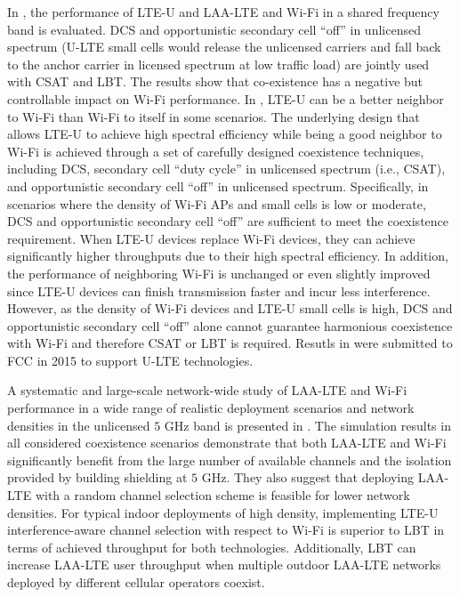 In \cite{U-LTE-Wi-Fi-Qualcomm-2014, LTE-U-Wi-Fi-LTE-U-Forum-2015, LTE-U-Qualcomm-2015, U-LTE-Wi-Fi-Qualcomm-FCC-2015}, the performance of LTE-U and LAA-LTE and Wi-Fi in a shared frequency band is evaluated. DCS and opportunistic secondary cell ``off'' in unlicensed spectrum (U-LTE small cells would release the unlicensed carriers and fall back to the anchor carrier in licensed spectrum at low traffic load) are jointly used with CSAT and LBT. The results show that co-existence has a negative but controllable impact on Wi-Fi performance. In \cite{U-LTE-Wi-Fi-Qualcomm-2014, LTE-U-Wi-Fi-LTE-U-Forum-2015, LTE-U-Qualcomm-2015}, LTE-U can be a better neighbor to Wi-Fi than Wi-Fi to itself in some scenarios. The underlying design that allows LTE-U to achieve high spectral efficiency while being a good neighbor to Wi-Fi is achieved through a set of carefully designed coexistence techniques, including DCS, secondary cell ``duty cycle'' in unlicensed spectrum (i.e., CSAT), and opportunistic secondary cell ``off'' in unlicensed spectrum. Specifically, in scenarios where the density of Wi-Fi APs and small cells is low or moderate, DCS and opportunistic secondary cell ``off'' are sufficient to meet the coexistence requirement. When LTE-U devices replace Wi-Fi devices, they can achieve significantly higher throughputs due to their high spectral efficiency. In addition, the performance of neighboring Wi-Fi is unchanged or even slightly improved since LTE-U devices can finish transmission faster and incur less interference. However, as the density of Wi-Fi devices and LTE-U small cells is high, DCS and opportunistic secondary cell ``off'' alone cannot guarantee harmonious coexistence with Wi-Fi and therefore CSAT or LBT is required. Resutls in \cite{LTE-U-Wi-Fi-LTE-U-Forum-2015, U-LTE-Wi-Fi-Qualcomm-FCC-2015} were submitted to FCC in 2015 to support U-LTE technologies.

A systematic and large-scale network-wide study of LAA-LTE and Wi-Fi performance in a wide range of realistic deployment scenarios and network densities in the unlicensed $5$ GHz band is presented in \cite{LTE-U-ICC-WS-2015}. The simulation results in all considered coexistence scenarios demonstrate that both LAA-LTE and Wi-Fi significantly benefit from the large number of available channels and the isolation provided by building shielding at $5$ GHz. They also suggest that deploying LAA-LTE with a random channel selection scheme is feasible for lower network densities. For typical indoor deployments of high density, implementing LTE-U interference-aware channel selection with respect to Wi-Fi is superior to LBT in terms of achieved throughput for both technologies. Additionally, LBT can increase LAA-LTE user throughput when multiple outdoor LAA-LTE networks deployed by different cellular operators coexist.

